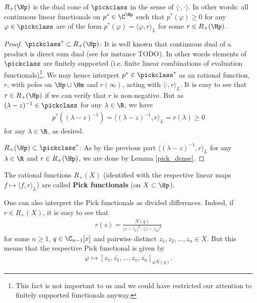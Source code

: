 \begin{lause}\label{pick_functionals}
	$R_{+}(\Hp)$ is the dual cone of $\pickclass$ in the sense of $\langle \cdot, \cdot \rangle$. In other words: all continuous linear functionals on $p^{*} \in \C^{\Hp}$ such that $p^{*}(\varphi) \geq 0$ for any $\varphi \in \pickclass$ are of the form $p^{*}(\varphi) = \langle \varphi, r \rangle_{L}$ for some $r \in R_{+}(\Hp)$.
\end{lause}
\begin{proof}
	$\pickclass^{*} \subset R_{+}(\Hp)$: It is well known that continuous dual of a product is direct sum dual (see for instance TODO). In other words elements of $\pickclass$ are finitely supported (i.e. finite linear combinations of evaluation functionals)\footnote{This fact is not important to us and we could have restricted our attention to finitely supported functionals anyway.}. We may hence interpret $p^{*} \in \pickclass^{*}$ as an rational function, $r$, with poles on $\Hp \cup \Hm$ and $r(\infty)$, acting with $\langle \cdot, r \rangle_{L}$. It is easy to see that $r \in R_{+}(\Hp)$ if we can verify that $r$ is non-negative. But as $(\lambda - z)^{-1} \in \pickclass$ for any $\lambda \in \R$, we have
	\begin{align*}
		p^{*}((\lambda - z)^{-1}) = \langle (\lambda - z)^{-1}, r \rangle_{L} = r(\lambda) \geq 0
	\end{align*}
	for any $\lambda \in \R$, as desired.

	$R_{+}(\Hp) \subset \pickclass^{*}$: As by the previous part $\langle (\lambda - z)^{-1}, r \rangle_{L}$ for any $\lambda \in \R$ and $r \in R_{+}(\Hp)$, we are done by Lemma \ref{pick_dense}.
\end{proof}

The rational functions $R_{+}(X)$ (identified with the respective linear maps $f \mapsto \langle f, r \rangle_{L}$) are called \textbf{Pick functionals} (on $X \subset \Hp$).

One can also interpret the Pick functionals as divided differences. Indeed, if $r \in R_{+}(X)$, it is easy to see that
\begin{align*}
	r(z) = \frac{N(q)}{|z - z_{1}|^2 \cdots |z - z_{n}|^2}
\end{align*}
for some $n \geq 1$, $q \in \C_{n - 1}[x]$ and pairwise distinct $z_{1}, z_{2}, \ldots, z_{n} \in X$. But this means that the respective Pick functional is given by
\begin{align*}
	\varphi \mapsto [z_{1}, \overline{z_{1}}, \ldots, z_{n}, \overline{z_{n}}]_{\varphi N(q)}.
\end{align*}

